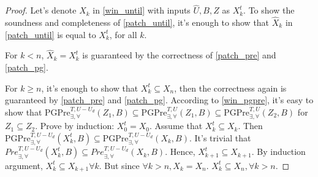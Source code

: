 \begin{proof}
	Let's denote $ X_k $ in \eqref{win_until} with inputs $ \widehat{U},B,\widehat{Z} $ as $ X_k^t $. 	To show the soundness and completeness of \eqref{patch_until}, it's enough to show that $ \widehat{X}_k $ in \eqref{patch_until} is equal to $ X_k^t $, for all $ k $. 
	
	For $ k< n $, $ \widehat{X}_k = X_k^t $ is guaranteed by the correctness of \eqref{patch_pre} and \eqref{patch_pg}. 
	
	For $ k\geq n $, it's enough to show that $ X^t_k \subseteq X_n $, then the correctness again is guaranteed by \eqref{patch_pre} and \eqref{patch_pg}. According to \eqref{win_pgpre}, it's easy to show that $ \text{PGPre}_{\exists,\forall}^{T,U-U_d}(Z_1,B)\subseteq \text{PGPre}_{\exists,\forall}^{T,U}(Z_1,B)\subseteq \text{PGPre}_{\exists,\forall}^{T,U}(Z_2,B) $ for $ Z_1\subseteq Z_2 $. Prove by induction:  $ X_0^t = X_0 $. Assume that $ X_k^t \subseteq X_k $. Then $ \text{PGPre}^{T,U-U_d}_{\exists,\forall}(X^t_{k},B) \subseteq \text{PGPre}^{T,U-U_d}_{\exists,\forall}(X_{k},B)$. It's trivial that $ Pre^{T,U-U_d}_{\exists,\forall}(X^t_{k},B) \subseteq Pre^{T,U-U_d}_{\exists,\forall}(X_{k},B)$. Hence, $ X^t_{k+1}\subseteq X_{k+1} $. By induction argument, $ X_{k}^t\subseteq X_{k+1} \forall k$. But since $ \forall k>n, X_k=X_n $. $ X^t_k \subseteq X_n, \forall k>n $.
\end{proof}

